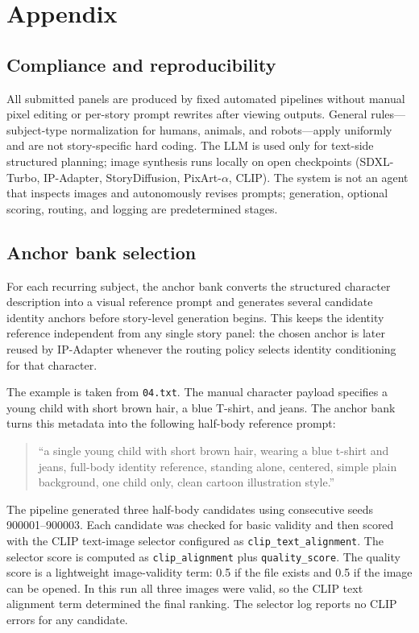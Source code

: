\section*{Appendix}

\subsection{Compliance and reproducibility}

All submitted panels are produced by fixed automated pipelines without manual pixel editing or per-story prompt rewrites after viewing outputs.
General rules---subject-type normalization for humans, animals, and robots---apply uniformly and are not story-specific hard coding.
The LLM is used only for text-side structured planning; image synthesis runs locally on open checkpoints (SDXL-Turbo, IP-Adapter, StoryDiffusion, PixArt-$\alpha$, CLIP).
The system is not an agent that inspects images and autonomously revises prompts; generation, optional scoring, routing, and logging are predetermined stages.



\subsection{Anchor bank selection}

For each recurring subject, the anchor bank converts the structured character description into a visual reference prompt and generates several candidate identity anchors before story-level generation begins.  This keeps the identity reference independent from any single story panel: the chosen anchor is later reused by IP-Adapter whenever the routing policy selects identity conditioning for that character.

The example is taken from \texttt{04.txt}.  The manual character payload specifies a young child with short brown hair, a blue T-shirt, and jeans.  The anchor bank turns this metadata into the following half-body reference prompt:
\begin{quote}
\footnotesize
``a single young child with short brown hair, wearing a blue t-shirt and jeans, full-body identity reference, standing alone, centered, simple plain background, one child only, clean cartoon illustration style.''
\end{quote}

The pipeline generated three half-body candidates using consecutive seeds 900001--900003.  Each candidate was checked for basic validity and then scored with the CLIP text-image selector configured as \texttt{clip\_text\_alignment}.  The selector score is computed as \texttt{clip\_alignment} plus \texttt{quality\_score}.  The quality score is a lightweight image-validity term: 0.5 if the file exists and 0.5 if the image can be opened.  In this run all three images were valid, so the CLIP text alignment term determined the final ranking.  The selector log reports no CLIP errors for any candidate.


